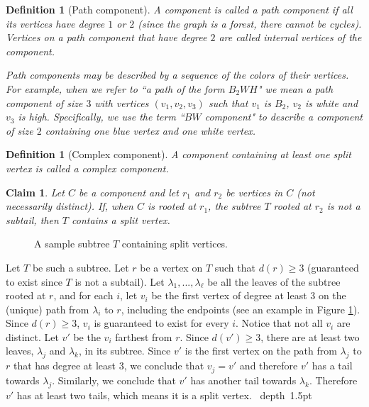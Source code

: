 \documentclass[11pt]{article}
\def\Proof{\par\noindent{\bf Proof:~}}
\def\blackslug{\hbox{\hskip 1pt \vrule width 4pt height 8pt
    depth 1.5pt \hskip 1pt}}
\def\QED{\quad\blackslug\lower 8.5pt\null\par}
\newtheorem{definition}[theorem]{Definition}
\newtheorem{claim}[theorem]{Claim}
\theoremstyle{definition}
\begin{document}
\begin{definition}[Path component] 
A component is called a \emph{path component} if all its vertices have degree $1$ or $2$ 
(since the graph is a forest, there cannot be cycles).
Vertices on a path component that have degree $2$ are called \emph{internal vertices} of the component.

Path components may be described by a sequence of the colors of their vertices. 
For example, when we refer to ``\emph{a path of the form $B_2WH$}" we mean a path component of size $3$ with vertices $(v_1, v_2, v_3)$ such that $v_1$ is $B_2$, $v_2$ is white and $v_3$ is high.
Specifically, we use the term ``\emph{$BW$ component}" to describe a component of size $2$ containing one blue vertex and one white vertex. 
\end{definition}
	
\begin{definition}[Complex component] 
A component containing at least one split vertex is called a \emph{complex component}.
\end{definition}


\begin{claim}
\label{claim:every_tree_has_split}
Let $C$ be a component and let $r_1$ and $r_2$ be vertices in $C$ (not necessarily distinct).
If, when $C$ is rooted at $r_1$, the subtree $T$ rooted at $r_2$ is not a subtail, then $T$ contains a split vertex.
\end{claim}
\begin{figure}[thbp]
  \caption{\sf A sample subtree $T$ containing split vertices.}
  \medskip
  \centering
  \label{fig:subtree_splits}
\end{figure}
\Proof
Let $T$ be such a subtree. Let $r$ be a vertex on $T$ such that $d(r) \geq 3$ (guaranteed to exist since $T$ is not a subtail).
Let $\lambda_1, ..., \lambda_\ell$ be all the leaves of the subtree rooted at $r$, and for each $i$, let $v_i$ be the first vertex of degree at least $3$ on the (unique) path from $\lambda_i$ to $r$, including the endpoints (see an example in Figure \ref{fig:subtree_splits}). 
Since $d(r) \geq 3$, $v_i$ is guaranteed to exist for every $i$.
Notice that not all $v_i$ are distinct.
Let $v'$ be the $v_i$ farthest from $r$. 
Since $d(v') \geq 3$, there are at least two leaves, $\lambda_j$ and $\lambda_k$, in its subtree.
Since $v'$ is the first vertex on the path from $\lambda_j$ to $r$ that has degree at least $3$, we conclude that $v_j = v'$ and therefore $v'$ has a tail towards $\lambda_j$.
Similarly, we conclude that $v'$ has another tail towards $\lambda_k$.
Therefore $v'$ has at least two tails, which means it is a split vertex.
\QED
\end{document}
